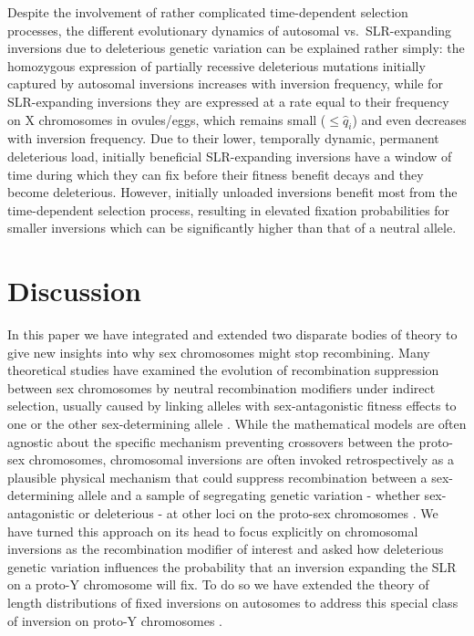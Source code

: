 \documentclass[11pt]{article}
\begin{document}
Despite the involvement of rather complicated time-dependent selection processes, the different evolutionary dynamics of autosomal vs.~SLR-expanding inversions due to deleterious genetic variation can be explained rather simply: the homozygous expression of partially recessive deleterious mutations initially captured by autosomal inversions increases with inversion frequency, while for SLR-expanding inversions they are expressed at a rate equal to their frequency on X chromosomes in ovules/eggs, which remains small ($\leq \hat{q}_i$) and even decreases with inversion frequency. Due to their lower, temporally dynamic, permanent deleterious load, initially beneficial SLR-expanding inversions have a window of time during which they can fix before their fitness benefit decays and they become deleterious. However, initially unloaded inversions benefit most from the time-dependent selection process, resulting in elevated fixation probabilities for smaller inversions which can be significantly higher than that of a neutral allele.




\section*{Discussion}

In this paper we have integrated and extended two disparate bodies of theory to give new insights into why sex chromosomes might stop recombining. Many theoretical studies have examined the evolution of recombination suppression between sex chromosomes by neutral recombination modifiers under indirect selection, usually caused by linking alleles with sex-antagonistic fitness effects to one or the other sex-determining allele \citep[e.g.,][]{Fisher1931,Nei1969,Charlesworth1980,Bull1983,Rice1987,Lenormand2003,Otto2019}. While the mathematical models are often agnostic about the specific mechanism preventing crossovers between the proto-sex chromosomes, chromosomal inversions are often invoked retrospectively as a plausible physical mechanism that could suppress recombination between a sex-determining allele and a sample of segregating genetic variation - whether sex-antagonistic or deleterious - at other loci on the proto-sex chromosomes \citep[e.g.,][]{Charlesworth1980,Rice1987,CharlesworthMarais2005,BergeroCharlesworth2009,Charlesworth2017,Ponnikas2018}. We have turned this approach on its head to focus explicitly on chromosomal inversions as the recombination modifier of interest and asked how deleterious genetic variation influences the probability that an inversion expanding the SLR on a proto-Y chromosome will fix. To do so we have extended the theory of length distributions of fixed inversions on autosomes to address this special class of inversion on proto-Y chromosomes \citep[e.g.,][]{vanValenLevins1968,Nei1967,Santos1986,ChengKirkpatrick2019,ConnallonOlito2020}.
\end{document}
